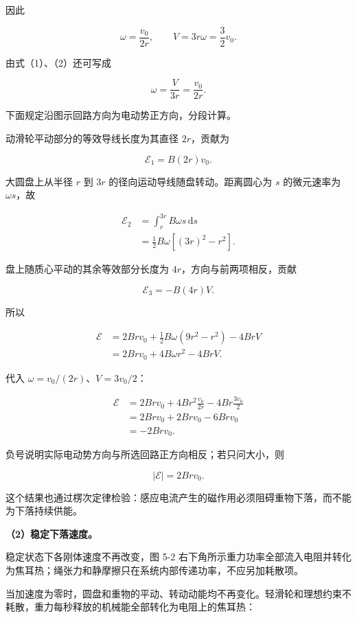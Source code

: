 \documentclass[12pt,a4paper,UTF8]{ctexart}
\begin{document}
因此

\[
\omega=\frac{v_0}{2r},
\qquad
\boxed{V=3r\omega=\frac32v_0}.\tag{2}
\]

由式（1）、（2）还可写成

\[\omega=\frac{V}{3r}=\frac{v_0}{2r}.\tag{3}\]

下面规定沿图示回路方向为电动势正方向，分段计算。

动滑轮平动部分的等效导线长度为其直径 \(2r\)，贡献为

\[\mathcal E_1=B(2r)v_0.\]

大圆盘上从半径 \(r\) 到 \(3r\) 的径向运动导线随盘转动。距离圆心为 \(s\)
的微元速率为 \(\omega s\)，故

\[
\begin{aligned}
\mathcal E_2
&=\int_r^{3r}B\omega s\,\mathrm ds\\
&=\frac12B\omega[(3r)^2-r^2].
\end{aligned}
\]

盘上随质心平动的其余等效部分长度为 \(4r\)，方向与前两项相反，贡献

\[\mathcal E_3=-B(4r)V.\]

所以

\[
\begin{aligned}
\mathcal E
&=2Brv_0+\frac12B\omega(9r^2-r^2)-4BrV\\
&=2Brv_0+4B\omega r^2-4BrV.
\end{aligned}
\]

代入 \(\omega=v_0/(2r)\)、\(V=3v_0/2\)：

\[
\begin{aligned}
\mathcal E
&=2Brv_0+4Br^2\frac{v_0}{2r}-4Br\frac{3v_0}{2}\\
&=2Brv_0+2Brv_0-6Brv_0\\
&=\boxed{-2Brv_0}.
\end{aligned}
\]

负号说明实际电动势方向与所选回路正方向相反；若只问大小，则

\[\boxed{|\mathcal E|=2Brv_0}.\]

这个结果也通过楞次定律检验：感应电流产生的磁作用必须阻碍重物下落，而不能为下落持续供能。

\textbf{（2）稳定下落速度。}

稳定状态下各刚体速度不再改变，图 5-2
右下角所示重力功率全部流入电阻并转化为焦耳热；绳张力和静摩擦只在系统内部传递功率，不应另加耗散项。

当加速度为零时，圆盘和重物的平动、转动动能均不再变化。轻滑轮和理想约束不耗散，重力每秒释放的机械能全部转化为电阻上的焦耳热：
\end{document}
